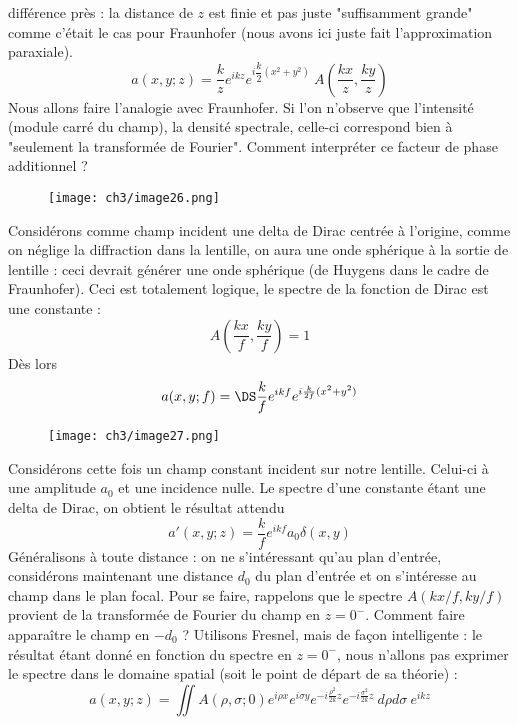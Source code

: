 différence près : la distance de $z$ est finie et pas juste "suffisamment grande" comme c'était le cas 
pour Fraunhofer (nous avons ici juste fait l'approximation paraxiale).
\begin{equation}
a(x,y;z) = \dfrac{k}{z} e^{ikz} e^{i\dfrac{k}{2}(x^2+y^2)}\ A\left(\frac{kx}{z},\frac{ky}{z}\right)
\end{equation}
Nous allons faire l'analogie avec Fraunhofer. Si l'on n'observe que l'intensité (module carré du 
champ), la densité spectrale, celle-ci correspond bien à "seulement la transformée de Fourier". Comment 
interpréter ce facteur de phase additionnel ? \\

	\begin{wrapfigure}[8]{r}{5cm}
	\vspace{-8mm}
	\texttt{[image: ch3/image26.png]}
	\end{wrapfigure}		
Considérons comme champ incident une delta de Dirac centrée à l'origine, 
comme on néglige la diffraction dans la lentille, on aura une onde sphérique à la sortie de lentille :
ceci devrait générer une onde sphérique (de Huygens dans le cadre de Fraunhofer).
Ceci est totalement logique, le spectre de la 
fonction de Dirac est une constante :
\begin{equation}
A\left(\frac{kx}{f},\frac{ky}{f}\right)=1
\end{equation}
Dès lors
\begin{equation}
a(x,y;f) = \DS \dfrac{k}{f}e^{ikf} e^{i\frac{k}{2f}(x^2+y^2)}
\end{equation}

	\begin{wrapfigure}[9]{l}{5cm}
	\vspace{-12mm}
	\texttt{[image: ch3/image27.png]}
	\end{wrapfigure}	
Considérons cette fois un champ constant incident sur notre lentille. Celui-ci à une amplitude $a_0$ et 
une incidence nulle. Le spectre d'une constante étant une delta de Dirac, on obtient le résultat attendu
\begin{equation}
a'(x,y;z) = \frac{k}{f}e^{ikf}a_0\delta(x,y)
\end{equation}
Généralisons à toute distance  : on ne s'intéressant qu'au plan d'entrée, considérons maintenant une 
distance $d_0$ du plan d'entrée et on s'intéresse au champ dans le plan focal. Pour se faire, rappelons 
que le spectre $A(kx/f,ky/f)$ provient de la transformée de Fourier du champ en $z=0^-$. Comment faire 
apparaître le champ en $-d_0$ ? Utilisons Fresnel, mais de façon intelligente : le résultat étant donné 
en fonction du spectre en $z=0^-$, nous n'allons pas exprimer le spectre dans le domaine spatial (soit 
le point de départ de sa théorie) :
\begin{equation}
a(x,y;z) = \iint A(\rho,\sigma;0)e^{i\rho x}e^{i\sigma y} e^{-i\frac{\rho^2}{2k}z}
e^{-i\frac{\sigma^2}{2k}z}\ d\rho d\sigma\ e^{ikz}
\end{equation}

